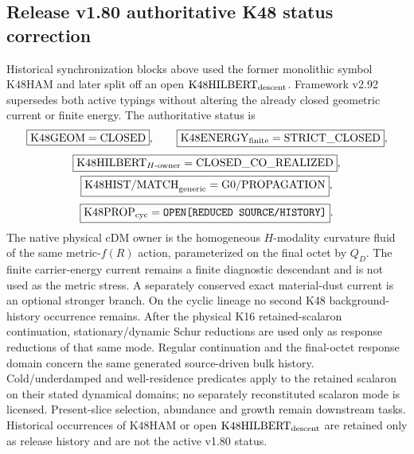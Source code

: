 \documentclass[12pt,a4paper]{article}
\begin{document}
\subsection{Release v1.80 authoritative K48 status correction}
\label{p9:sec:v180-authoritative-k48-status}
Historical synchronization blocks above used the former monolithic symbol
$\mathrm{K48HAM}$ and later split off an open
$\mathrm{K48HILBERT}_{\rm descent}$.  Framework v2.92 supersedes both active
typings without altering the already closed geometric current or finite energy.
The authoritative status is
\[
 \boxed{\mathrm{K48GEOM}=\mathrm{CLOSED}},\qquad
 \boxed{\mathrm{K48ENERGY}_{\rm finite}=\mathrm{STRICT\_CLOSED}},
\]
\[
 \begin{gathered}
 \boxed{\mathrm{K48HILBERT}_{H\text{-owner}}=\mathrm{CLOSED\_CO\_REALIZED}},\\
 \boxed{\mathrm{K48HIST/MATCH}_{\rm generic}=\mathrm{G0/PROPAGATION}},
 \end{gathered}
\]
\[
 \boxed{\mathrm{K48PROP}_{\rm cyc}
 =\texttt{OPEN[REDUCED\ SOURCE/HISTORY]}}.
\]
The native physical cDM owner is the homogeneous $H$-modality curvature fluid
of the same metric-$f(R)$ action, parameterized on the final octet by $Q_D$.
The finite carrier-energy current remains a finite diagnostic descendant and is
not used as the metric stress.  A separately conserved exact material-dust
current is an optional stronger branch.  On the cyclic lineage no second K48
background-history occurrence remains.  After the physical K16 retained-scalaron continuation, stationary/dynamic Schur reductions are used only as response reductions of that same mode.
Regular continuation and the final-octet response domain concern the same generated
source-driven bulk history.  Cold/underdamped and well-residence predicates apply
to the retained scalaron on their stated dynamical domains; no separately reconstituted scalaron mode is licensed.
Present-slice selection, abundance and growth remain downstream tasks.
Historical occurrences of $\mathrm{K48HAM}$ or open
$\mathrm{K48HILBERT}_{\rm descent}$ are retained only as release history and
are not the active v1.80 status.

\end{document}
